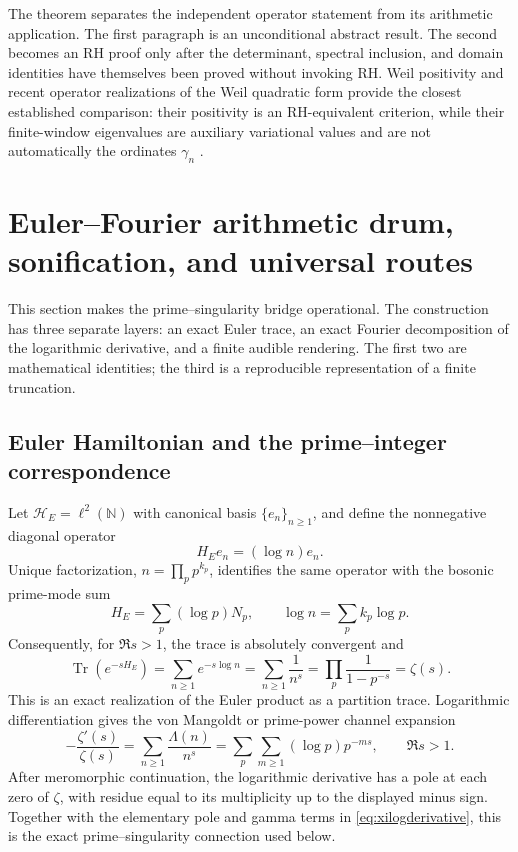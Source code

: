 \documentclass[11pt]{amsart}
\theoremstyle{definition}
\theoremstyle{remark}
\begin{document}
The theorem separates the independent operator statement from its arithmetic application.
The first paragraph is an unconditional abstract result.  The second becomes an RH proof only
after the determinant, spectral inclusion, and domain identities have themselves been proved
without invoking RH.  Weil positivity and recent operator
realizations of the Weil quadratic form provide the closest established comparison: their
positivity is an RH-equivalent criterion, while their finite-window eigenvalues are auxiliary
variational values and are not automatically the ordinates $\gamma_n$
\cite{ConnesConsaniScaling,ConnesConsaniWeil,Suzuki2026}.

\section{Euler--Fourier arithmetic drum, sonification, and universal routes}
\label{sec:euler-fourier-drum}

This section makes the prime--singularity bridge operational.  The construction has three
separate layers: an exact Euler trace, an exact Fourier decomposition of the logarithmic
derivative, and a finite audible rendering.  The first two are mathematical identities; the
third is a reproducible representation of a finite truncation.

\subsection{Euler Hamiltonian and the prime--integer correspondence}
Let $\mathcal H_E=\ell^2(\mathbb N)$ with canonical basis $\{e_n\}_{n\ge1}$, and define
the nonnegative diagonal operator
\begin{equation}\label{eq:eulerHamiltonian}
 H_Ee_n=(\log n)e_n.
\end{equation}
Unique factorization, $n=\prod_p p^{k_p}$, identifies the same operator with the bosonic
prime-mode sum
\begin{equation}\label{eq:eulerFockHamiltonian}
 H_E=\sum_p(\log p)N_p,
 \qquad
 \log n=\sum_p k_p\log p.
\end{equation}
Consequently, for $\Re s>1$, the trace is absolutely convergent and
\begin{equation}\label{eq:eulerTraceZeta}
 \operatorname{Tr}(e^{-sH_E})
 =\sum_{n\ge1}e^{-s\log n}
 =\sum_{n\ge1}\frac1{n^s}
 =\prod_p\frac1{1-p^{-s}}
 =\zeta(s).
\end{equation}
This is an exact realization of the Euler product as a partition trace.  Logarithmic
differentiation gives the von Mangoldt or prime-power channel expansion
\begin{equation}\label{eq:eulerLogDerivativeComb}
 -\frac{\zeta'(s)}{\zeta(s)}
 =\sum_{n\ge1}\frac{\Lambda(n)}{n^s}
 =\sum_p\sum_{m\ge1}(\log p)p^{-ms},
 \qquad \Re s>1.
\end{equation}
After meromorphic continuation, the logarithmic derivative has a pole at each zero of
$\zeta$, with residue equal to its multiplicity up to the displayed minus sign.  Together
with the elementary pole and gamma terms in \eqref{eq:xilogderivative}, this is the exact
prime--singularity connection used below.
\end{document}
